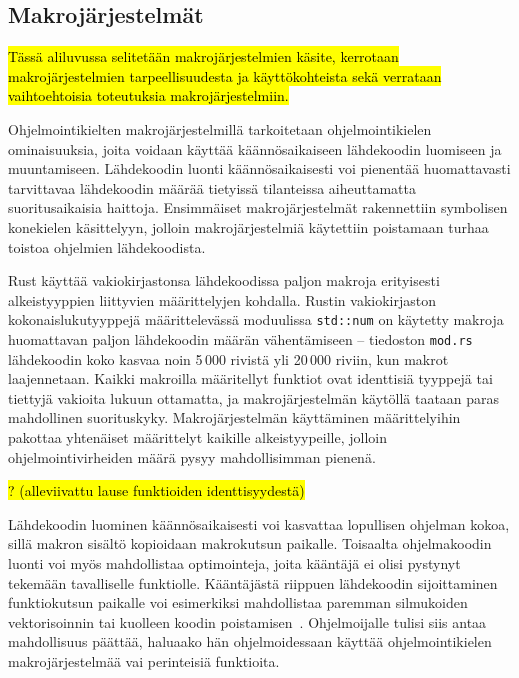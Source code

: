 
\subsection{Makrojärjestelmät}

\hl{Tässä aliluvussa selitetään makrojärjestelmien käsite, kerrotaan
makrojärjestelmien tarpeellisuudesta ja käyttökohteista sekä verrataan
vaihtoehtoisia toteutuksia makrojärjestelmiin.}

Ohjelmointikielten makrojärjestelmillä tarkoitetaan ohjelmointikielen
ominaisuuksia, joita voidaan käyttää käännösaikaiseen lähdekoodin luomiseen ja
muuntamiseen. Lähdekoodin luonti käännösaikaisesti voi pienentää huomattavasti
tarvittavaa lähdekoodin määrää tietyissä tilanteissa aiheuttamatta
suoritusaikaisia haittoja. Ensimmäiset makrojärjestelmät rakennettiin
symbolisen konekielen käsittelyyn, jolloin makrojärjestelmiä käytettiin
poistamaan turhaa toistoa ohjelmien lähdekoodista.

Rust käyttää vakiokirjastonsa lähdekoodissa paljon makroja erityisesti
alkeistyyppien liittyvien määrittelyjen kohdalla. Rustin vakiokirjaston
kokonaislukutyyppejä määrittelevässä moduulissa \texttt{std::num} on käytetty
makroja huomattavan paljon lähdekoodin määrän vähentämiseen -- tiedoston
\texttt{mod.rs} lähdekoodin koko kasvaa noin 5\,000 rivistä yli 20\,000 riviin,
kun makrot laajennetaan. Kaikki makroilla määritellyt funktiot ovat identtisiä
tyyppejä tai tiettyjä vakioita lukuun ottamatta, ja makrojärjestelmän käytöllä
taataan paras mahdollinen suorituskyky. Makrojärjestelmän käyttäminen
määrittelyihin pakottaa yhtenäiset määrittelyt kaikille alkeistyypeille,
jolloin ohjelmointivirheiden määrä pysyy mahdollisimman pienenä.

\hl{? (alleviivattu lause funktioiden identtisyydestä)}

Lähdekoodin luominen käännösaikaisesti voi kasvattaa lopullisen ohjelman kokoa,
sillä makron sisältö kopioidaan makrokutsun paikalle. Toisaalta ohjelmakoodin
luonti voi myös mahdollistaa optimointeja, joita kääntäjä ei olisi pystynyt
tekemään tavalliselle funktiolle. Kääntäjästä riippuen lähdekoodin
sijoittaminen funktiokutsun paikalle voi esimerkiksi mahdollistaa paremman
silmukoiden vektorisoinnin tai kuolleen koodin poistamisen~\citep{cinlining}.
Ohjelmoijalle tulisi siis antaa mahdollisuus päättää, haluaako hän
ohjelmoidessaan käyttää ohjelmointikielen makrojärjestelmää vai perinteisiä
funktioita.

